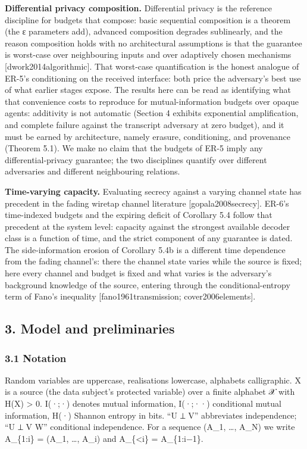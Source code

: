 \documentclass[
  11pt,
]{article}
\begin{document}
\textbf{Differential privacy composition.} Differential privacy is the
reference discipline for budgets that compose: basic sequential
composition is a theorem (the ε parameters add), advanced composition
degrades sublinearly, and the reason composition holds with no
architectural assumptions is that the guarantee is worst-case over
neighbouring inputs and over adaptively chosen mechanisms
{[}dwork2014algorithmic{]}. That worst-case quantification is the honest
analogue of ER-5's conditioning on the received interface: both price
the adversary's best use of what earlier stages expose. The results here
can be read as identifying what that convenience costs to reproduce for
mutual-information budgets over opaque agents: additivity is not
automatic (Section 4 exhibits exponential amplification, and complete
failure against the transcript adversary at zero budget), and it must be
earned by architecture, namely erasure, conditioning, and provenance
(Theorem 5.1). We make no claim that the budgets of ER-5 imply any
differential-privacy guarantee; the two disciplines quantify over
different adversaries and different neighbouring relations.

\textbf{Time-varying capacity.} Evaluating secrecy against a varying
channel state has precedent in the fading wiretap channel literature
{[}gopala2008secrecy{]}. ER-6's time-indexed budgets and the expiring
deficit of Corollary 5.4 follow that precedent at the system level:
capacity against the strongest available decoder class is a function of
time, and the strict component of any guarantee is dated. The
side-information erosion of Corollary 5.4b is a different time
dependence from the fading channel's: there the channel state varies
while the source is fixed; here every channel and budget is fixed and
what varies is the adversary's background knowledge of the source,
entering through the conditional-entropy term of Fano's inequality
{[}fano1961transmission; cover2006elements{]}.

\subsection{3. Model and preliminaries}\label{model-and-preliminaries}

\subsubsection{3.1 Notation}\label{notation}

Random variables are uppercase, realisations lowercase, alphabets
calligraphic. X is a source (the data subject's protected variable) over
a finite alphabet 𝒳 with H(X) \textgreater{} 0. I(·;·) denotes mutual
information, I(·;·\textbar·) conditional mutual information, H(·)
Shannon entropy in bits. ``U ⊥ V'' abbreviates independence; ``U ⊥ V
\textbar{} W'' conditional independence. For a sequence (A\_1, \ldots,
A\_N) we write A\_\{1:i\} = (A\_1, \ldots, A\_i) and A\_\{\textless i\}
= A\_\{1:i−1\}.
\end{document}
